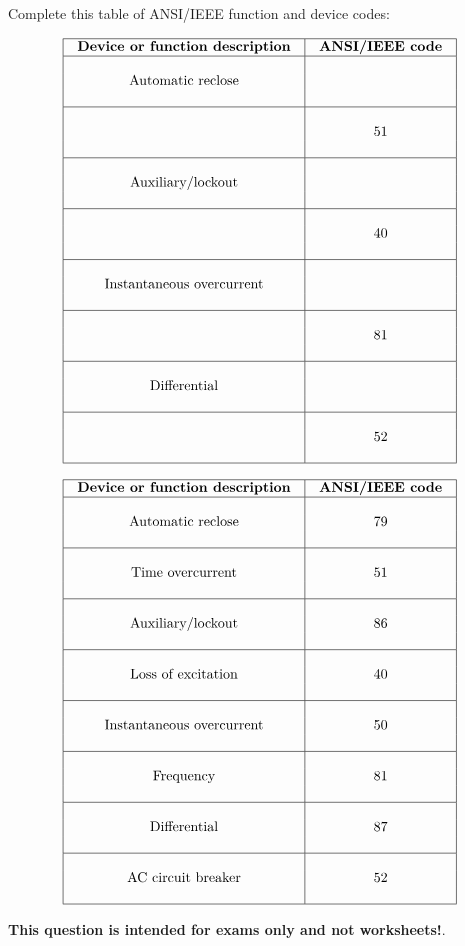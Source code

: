 

Complete this table of ANSI/IEEE function and device codes:


$$\vbox{\offinterlineskip
\halign{\strut
\vrule \quad\hfil # \ \hfil & 
\vrule \quad\hfil # \ \hfil \vrule \cr
\noalign{\hrule}
%
{\bf Device or function description} & {\bf ANSI/IEEE code} \cr
%
\noalign{\hrule}
%
 &  \cr
Automatic reclose &  \cr
 &  \cr
%
\noalign{\hrule}
%
 &  \cr
 & 51 \cr
 &  \cr
%
\noalign{\hrule}
%
 &  \cr
Auxiliary/lockout &  \cr
 &  \cr
%
\noalign{\hrule}
%
 &  \cr
 & 40 \cr
 &  \cr
%
\noalign{\hrule}
%
 &  \cr
Instantaneous overcurrent &  \cr
 &  \cr
%
\noalign{\hrule}
%
 &  \cr
 & 81 \cr
 &  \cr
%
\noalign{\hrule}
%
 &  \cr
Differential &  \cr
 &  \cr
%
\noalign{\hrule}
%
 &  \cr
 & 52 \cr
 &  \cr
%
\noalign{\hrule}
} %
}$$ %









$$\vbox{\offinterlineskip
\halign{\strut
\vrule \quad\hfil # \ \hfil & 
\vrule \quad\hfil # \ \hfil \vrule \cr
\noalign{\hrule}
%
{\bf Device or function description} & {\bf ANSI/IEEE code} \cr
%
\noalign{\hrule}
%
 &  \cr
Automatic reclose & 79 \cr
 &  \cr
%
\noalign{\hrule}
%
 &  \cr
Time overcurrent & 51 \cr
 &  \cr
%
\noalign{\hrule}
%
 &  \cr
Auxiliary/lockout & 86 \cr
 &  \cr
%
\noalign{\hrule}
%
 &  \cr
Loss of excitation & 40 \cr
 &  \cr
%
\noalign{\hrule}
%
 &  \cr
Instantaneous overcurrent & 50 \cr
 &  \cr
%
\noalign{\hrule}
%
 &  \cr
Frequency & 81 \cr
 &  \cr
%
\noalign{\hrule}
%
 &  \cr
Differential & 87 \cr
 &  \cr
%
\noalign{\hrule}
%
 &  \cr
AC circuit breaker & 52 \cr
 &  \cr
%
\noalign{\hrule}
} %
}$$ %







{\bf This question is intended for exams only and not worksheets!}.



